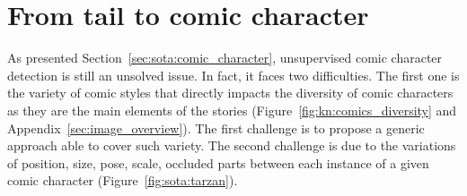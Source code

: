 



\section{From tail to comic character} %
\label{sec:se:tail_to_character}



As presented Section~\ref{sec:sota:comic_character}, unsupervised comic character detection is still an unsolved issue.
In fact, it faces two difficulties.
The first one is the variety of comic styles that directly impacts the diversity of comic characters as they are the main elements of the stories (Figure~\ref{fig:kn:comics_diversity} and Appendix~\ref{sec:image_overview}).
The first challenge is to propose a generic approach able to cover such variety.
The second challenge is due to the variations of position, size, pose, scale, occluded parts between each instance of a given comic character (Figure~\ref{fig:sota:tarzan}).

